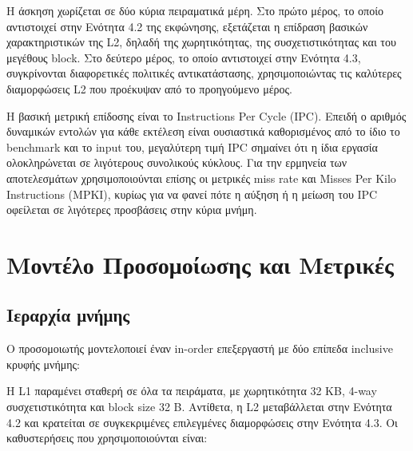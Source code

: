 \documentclass{article}
\begin{document}
Η άσκηση χωρίζεται σε δύο κύρια πειραματικά μέρη. Στο πρώτο μέρος, το οποίο αντιστοιχεί στην Ενότητα 4.2 της εκφώνησης, εξετάζεται η επίδραση βασικών χαρακτηριστικών της L2, δηλαδή της χωρητικότητας, της συσχετιστικότητας και του μεγέθους block. Στο δεύτερο μέρος, το οποίο αντιστοιχεί στην Ενότητα 4.3, συγκρίνονται διαφορετικές πολιτικές αντικατάστασης, χρησιμοποιώντας τις καλύτερες διαμορφώσεις L2 που προέκυψαν από το προηγούμενο μέρος.

Η βασική μετρική επίδοσης είναι το \textlatin{Instructions Per Cycle} (IPC). Επειδή ο αριθμός δυναμικών εντολών για κάθε εκτέλεση είναι ουσιαστικά καθορισμένος από το ίδιο το benchmark και το input του, μεγαλύτερη τιμή IPC σημαίνει ότι η ίδια εργασία ολοκληρώνεται σε λιγότερους συνολικούς κύκλους. Για την ερμηνεία των αποτελεσμάτων χρησιμοποιούνται επίσης οι μετρικές \textlatin{miss rate} και \textlatin{Misses Per Kilo Instructions} (MPKI), κυρίως για να φανεί πότε η αύξηση ή η μείωση του IPC οφείλεται σε λιγότερες προσβάσεις στην κύρια μνήμη.

\section{Μοντέλο Προσομοίωσης και Μετρικές}

\subsection{Ιεραρχία μνήμης}

Ο προσομοιωτής μοντελοποιεί έναν \textlatin{in-order} επεξεργαστή με δύο επίπεδα \textlatin{inclusive} κρυφής μνήμης:

\begin{center}
\end{center}

Η L1 παραμένει σταθερή σε όλα τα πειράματα, με χωρητικότητα 32 KB, 4-way συσχετιστικότητα και block size 32 B. Αντίθετα, η L2 μεταβάλλεται στην Ενότητα 4.2 και κρατείται σε συγκεκριμένες επιλεγμένες διαμορφώσεις στην Ενότητα 4.3. Οι καθυστερήσεις που χρησιμοποιούνται είναι:
\end{document}
